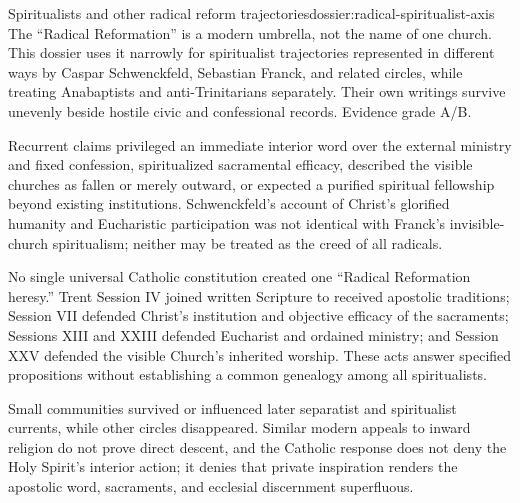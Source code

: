 \begin{heresydossier}{Spiritualists and other radical reform trajectories}{dossier:radical-spiritualist-axis}
\objectfield The ``Radical Reformation'' is a modern umbrella, not the name of one church. This dossier uses it narrowly for spiritualist trajectories represented in different ways by Caspar Schwenckfeld, Sebastian Franck, and related circles, while treating Anabaptists and anti-Trinitarians separately. Their own writings survive unevenly beside hostile civic and confessional records. Evidence grade A/B.

\propositionfield Recurrent claims privileged an immediate interior word over the external ministry and fixed confession, spiritualized sacramental efficacy, described the visible churches as fallen or merely outward, or expected a purified spiritual fellowship beyond existing institutions. Schwenckfeld's account of Christ's glorified humanity and Eucharistic participation was not identical with Franck's invisible-church spiritualism; neither may be treated as the creed of all radicals.

\responsefield No single universal Catholic constitution created one ``Radical Reformation heresy.'' Trent Session IV joined written Scripture to received apostolic traditions; Session VII defended Christ's institution and objective efficacy of the sacraments; Sessions XIII and XXIII defended Eucharist and ordained ministry; and Session XXV defended the visible Church's inherited worship. These acts answer specified propositions without establishing a common genealogy among all spiritualists.

\aftermathfield Small communities survived or influenced later separatist and spiritualist currents, while other circles disappeared. Similar modern appeals to inward religion do not prove direct descent, and the Catholic response does not deny the Holy Spirit's interior action; it denies that private inspiration renders the apostolic word, sacraments, and ecclesial discernment superfluous.
\end{heresydossier}

